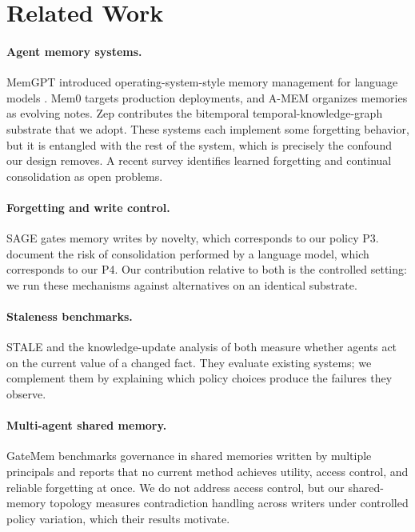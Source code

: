 \documentclass[letterpaper]{article} %
\begin{document}
\section{Related Work}

\paragraph{Agent memory systems.} MemGPT introduced operating-system-style memory management for language models \citep{packer2023memgpt}. Mem0 \citep{chhikara2025mem0} targets production deployments, and A-MEM \citep{xu2025amem} organizes memories as evolving notes. Zep \citep{rasmussen2025zep} contributes the bitemporal temporal-knowledge-graph substrate that we adopt. These systems each implement some forgetting behavior, but it is entangled with the rest of the system, which is precisely the confound our design removes. A recent survey \citep{du2026memory} identifies learned forgetting and continual consolidation as open problems.

\paragraph{Forgetting and write control.} SAGE \citep{wang2026sage} gates memory writes by novelty, which corresponds to our policy P3. \citet{zhang2026faulty} document the risk of consolidation performed by a language model, which corresponds to our P4. Our contribution relative to both is the controlled setting: we run these mechanisms against alternatives on an identical substrate.

\paragraph{Staleness benchmarks.} STALE \citep{chao2026stale} and the knowledge-update analysis of \citet{patel2026supersede} both measure whether agents act on the current value of a changed fact. They evaluate existing systems; we complement them by explaining which policy choices produce the failures they observe.

\paragraph{Multi-agent shared memory.} GateMem \citep{ren2026gatemem} benchmarks governance in shared memories written by multiple principals and reports that no current method achieves utility, access control, and reliable forgetting at once. We do not address access control, but our shared-memory topology measures contradiction handling across writers under controlled policy variation, which their results motivate.
\end{document}
